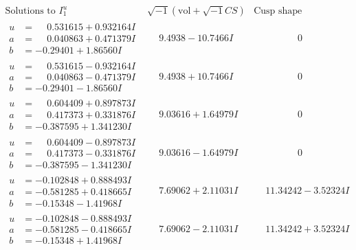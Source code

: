 \documentclass[1p]{elsarticle_modified}
\theoremstyle{definition}
\newcommand{\I}{\sqrt{-1}}
\begin{document}
$$\begin{array}{c|c|c}  
\text{Solutions to }I^u_{1}& \I (\text{vol} + \sqrt{-1}CS) & \text{Cusp shape}\\
 \hline 
\begin{aligned}
u &= \phantom{-}0.531615 + 0.932164 I \\
a &= \phantom{-}0.040863 + 0.471379 I \\
b &= -0.29401 + 1.86560 I\end{aligned}
 & \phantom{-}9.4938 - 10.7466 I & \phantom{-0.000000 } 0 \\ \hline\begin{aligned}
u &= \phantom{-}0.531615 - 0.932164 I \\
a &= \phantom{-}0.040863 - 0.471379 I \\
b &= -0.29401 - 1.86560 I\end{aligned}
 & \phantom{-}9.4938 + 10.7466 I & \phantom{-0.000000 } 0 \\ \hline\begin{aligned}
u &= \phantom{-}0.604409 + 0.897873 I \\
a &= \phantom{-}0.417373 + 0.331876 I \\
b &= -0.387595 + 1.341230 I\end{aligned}
 & \phantom{-}9.03616 + 1.64979 I & \phantom{-0.000000 } 0 \\ \hline\begin{aligned}
u &= \phantom{-}0.604409 - 0.897873 I \\
a &= \phantom{-}0.417373 - 0.331876 I \\
b &= -0.387595 - 1.341230 I\end{aligned}
 & \phantom{-}9.03616 - 1.64979 I & \phantom{-0.000000 } 0 \\ \hline\begin{aligned}
u &= -0.102848 + 0.888493 I \\
a &= -0.581285 + 0.418665 I \\
b &= -0.15348 - 1.41968 I\end{aligned}
 & \phantom{-}7.69062 + 2.11031 I & \phantom{-}11.34242 - 3.52324 I \\ \hline\begin{aligned}
u &= -0.102848 - 0.888493 I \\
a &= -0.581285 - 0.418665 I \\
b &= -0.15348 + 1.41968 I\end{aligned}
 & \phantom{-}7.69062 - 2.11031 I & \phantom{-}11.34242 + 3.52324 I \\ \hline\begin{aligned}

\end{aligned}
\end{array}$$
\end{document}
